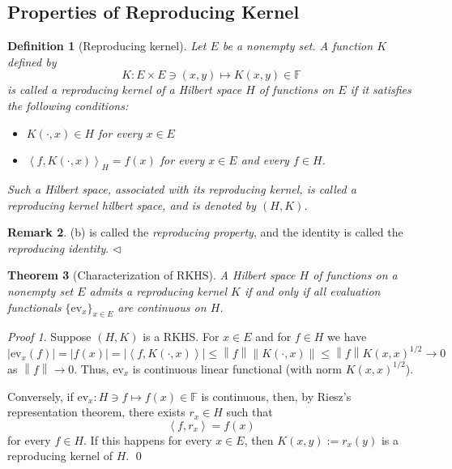 \documentclass[a4paper,12pt]{article}
\newtheorem{thm}{Theorem}[section]
\newtheorem{dfn}[thm]{Definition}
\theoremstyle{remark}
\newtheorem*{prf}{Proof}
\theoremstyle{definition}
\newtheorem{rem}[thm]{Remark}
\theoremstyle{definition}
\theoremstyle{definition}
\newcommand{\ip}[2]{\left<#1, #2 \right>}
\newcommand{\abs}[1]{\left| #1 \right|}
\newcommand{\norm}[1]{\left\| #1 \right\|}
\newcommand{\ev}[1]{\mathrm{ev}_{#1}}
\newcommand{\fin}{\hfill \( \triangleleft \) }
\begin{document}
\subsection{Properties of Reproducing Kernel}
\begin{dfn}[Reproducing kernel]
	Let \( E \) be a nonempty set. A function \( K \) defined by
	\[
		K:E \times E \ni (x,y) \mapsto K(x,y) \in \mathbb{F}
	\]
	is called a reproducing kernel of a Hilbert space \( H \) of functions on \( E \) if it satisfies the following conditions:
	\begin{itemize}
		\item[(a)] \( K(\cdot, x) \in H \) for every \( x \in E \)
		\item[(b)]  \( \ip{f}{K(\cdot, x)}_H = f(x) \) for every \( x \in E \) and every \( f \in H \).
	\end{itemize}
	Such a Hilbert space, associated with its reproducing kernel, is called a reproducing kernel hilbert space, and is denoted by \( (H,K) \).
\end{dfn}

\begin{rem}
	(b) is called the \textit{reproducing property}, and the identity is called the \textit{reproducing identity}.
	\fin\end{rem}


\begin{thm}[Characterization of RKHS]\label{chara RKHS}
	A Hilbert space \( H \) of functions on a nonempty set \( E \) admits a reproducing kernel \( K \) if and only if all evaluation functionals \( \{\ev{x} \} _{x \in E} \) are continuous on \( H \).
\end{thm}
\begin{prf}
	Suppose \( (H,K) \) is a RKHS.
	For \( x \in E \) and for \( f \in H \) we have
	\[
		\abs{\ev{x}(f)} = \abs{f(x)} = \abs{ \ip{f}{K(\cdot , x)}} \le \norm{f} \norm{K(\cdot,x )} \le \norm{f} K(x,x) ^{1/2} \to 0
	\]
	as \(  \norm{f}\to 0 \). Thus, \( \ev{x} \) is continuous linear functional (with norm \( K(x,x) ^{1/2} \)).

	Conversely, if \( \ev{x}:H \ni f \mapsto f(x) \in \mathbb{F} \) is continuous, then, by Riesz's representation theorem, there exists \( r_x \in H\) such that
	\begin{equation*}
		\ip{f}{r_x} = f(x)
	\end{equation*}
	for every \( f \in H \). If this happens for every \( x \in E \), then \( K(x,y):=r_x(y) \) is a reproducing kernel of \( H \).
	\qed\end{prf}
\end{document}
